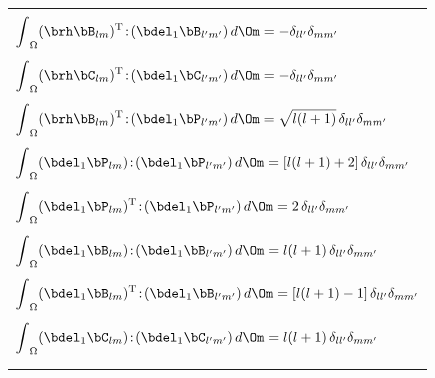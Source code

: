 \begin{table}[!t]
\vspace*{\fill}
\centering
\begin{tabular}{|l|} \hline \\ \hspace{1.2 mm}
$\displaystyle{\int}_{\Omega}(\brh\bB_{lm})^{\rm T}
\!:\!(\bdel_1\bB_{l'm'})\,d\/\Om=
-\delta_{ll'}\delta_{mm'}$ \hspace{1.0 mm} \\ \\ \hspace{1.2 mm}
$\displaystyle{\int}_{\Omega}(\brh\bC_{lm})^{\rm T}
\!:\!(\bdel_1\bC_{l'm'})\,d\/\Om=
-\delta_{ll'}\delta_{mm'}$ \hspace{1.0 mm} \\ \\ \hspace{1.2 mm}
$\displaystyle{\int}_{\Omega}(\brh\bB_{lm})^{\rm T}
\!:\!(\bdel_1\bP_{l'm'})\,d\/\Om=
\sqrt{l(l+1)}\,\delta_{ll'}\delta_{mm'}$ \hspace{1.0 mm} \\ \\ \hspace{1.2 mm}
$\displaystyle{\int}_{\Omega}(\bdel_1\bP_{lm})
\!:\!(\bdel_1\bP_{l'm'})\,d\/\Om=
[l(l+1)+2]\,\delta_{ll'}\delta_{mm'}$ \hspace{1.0 mm} \\ \\ \hspace{1.2 mm}
$\displaystyle{\int}_{\Omega}(\bdel_1\bP_{lm})^{\rm T}
\!:\!(\bdel_1\bP_{l'm'})\,d\/\Om=
2\,\delta_{ll'}\delta_{mm'}$ \hspace{1.0 mm} \\ \\ \hspace{1.2 mm}
$\displaystyle{\int}_{\Omega}(\bdel_1\bB_{lm})
\!:\!(\bdel_1\bB_{l'm'})\,d\/\Om=
l(l+1)\,\delta_{ll'}\delta_{mm'}$ \hspace{1.0 mm} \\ \\ \hspace{1.2 mm}
$\displaystyle{\int}_{\Omega}(\bdel_1\bB_{lm})^{\rm T}
\!:\!(\bdel_1\bB_{l'm'})\,d\/\Om=
[l(l+1)-1]\,\delta_{ll'}\delta_{mm'}$ \hspace{1.0 mm} \\ \\ \hspace{1.2 mm}
$\displaystyle{\int}_{\Omega}(\bdel_1\bC_{lm})
\!:\!(\bdel_1\bC_{l'm'})\,d\/\Om=
l(l+1)\,\delta_{ll'}\delta_{mm'}$ \hspace{1.0 mm} \\ \\ \hspace{1.2 mm}

\end{tabular}
\end{table}
